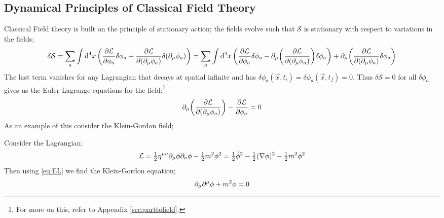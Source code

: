 \subsection{Dynamical Principles of Classical Field Theory}
Classical Field theory is built on the principle of stationary action; the fields evolve such that $\mathcal{S}$ is stationary with respect to variations in the fields;
\begin{dmath}
\delta \mathcal{S} = \sum_{a}{\int{\upd{^4 x} \left( \frac{\partial \mathcal{L}}{\partial \phi_a} \delta \phi_a +\frac{\partial \mathcal{L}}{\partial\left(\partial_\mu \phi_a \right)} \delta \left( \partial_\mu \phi_a \right)\right)}} = \sum_{a}{\int{\upd{^4 x} \left( \frac{\partial \mathcal{L}}{\partial \phi_a} \delta \phi_a - \partial_\mu \left(\frac{\partial \mathcal{L}}{\partial\left(\partial_\mu \phi_a \right)}\right) \delta  \phi_a \right) + \partial_\mu \left(\frac{\partial \mathcal{L}}{\partial\left(\partial_\mu \phi_a \right)} \delta \phi_a \right)}}
\end{dmath}
The last term vanishes for any Lagrangian that decays at spatial infinite and has $\delta \phi_a (\vec x, t_i) = \delta \phi_a (\vec x, t_f) = 0$. Thus $\delta \mathcal{S} = 0$ for all $\delta \phi_a$ gives us the Euler-Lagrange equations for the field:\footnote{For more on this, refer to Appendix \ref{sec:parttofield}.} 
\begin{equation}
\label{eq:EL}
\partial_\mu \left(\frac{\partial \mathcal{L}}{\del\left(\del_\mu \phi_a\right)}\right) - \frac{\partial \mathcal{L}}{\partial \phi_a} = 0
\end{equation}
As an example of this consider the Klein-Gordon field;
\begin{examplebox}	
Consider the Lagrangian;
\begin{equation*}
\mathcal{L} = \tfrac{1}{2}\eta^{\mu \nu}\partial_\mu \phi \partial_\nu \phi - \tfrac{1}{2} m^2 \phi^2 = \tfrac{1}{2} \dot{\phi}^2 - \tfrac{1}{2}(\nabla \phi)^2 - \tfrac{1}{2} m^2 \phi^2
\end{equation*}
Then using \eqref{eq:EL} we find the Klein-Gordon equation;
\begin{equation}
\partial_\mu \partial^\mu \phi + m^2 \phi = 0
\end{equation}
\end{examplebox}
